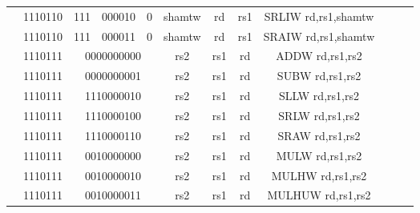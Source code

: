 \begin{table}[p]
\begin{small}
\begin{center}
\begin{tabular}{rcccccccccccl}
&
\multicolumn{1}{|c|}{1110110} &
\multicolumn{1}{c|}{111} &
\multicolumn{2}{c|}{000010} &
\multicolumn{1}{c|}{0} &
\multicolumn{1}{c|}{shamtw} &
\multicolumn{1}{c|}{rd} &
\multicolumn{1}{c|}{rs1} & SRLIW rd,rs1,shamtw \\
\cline{2-9}
  

&
\multicolumn{1}{|c|}{1110110} &
\multicolumn{1}{c|}{111} &
\multicolumn{2}{c|}{000011} &
\multicolumn{1}{c|}{0} &
\multicolumn{1}{c|}{shamtw} &
\multicolumn{1}{c|}{rd} &
\multicolumn{1}{c|}{rs1} & SRAIW rd,rs1,shamtw \\
\cline{2-9}
  

&
\multicolumn{1}{|c|}{1110111} &
\multicolumn{4}{c|}{0000000000} &
\multicolumn{1}{c|}{rs2} &
\multicolumn{1}{c|}{rs1} &
\multicolumn{1}{c|}{rd} & ADDW rd,rs1,rs2 \\
\cline{2-9}
  

&
\multicolumn{1}{|c|}{1110111} &
\multicolumn{4}{c|}{0000000001} &
\multicolumn{1}{c|}{rs2} &
\multicolumn{1}{c|}{rs1} &
\multicolumn{1}{c|}{rd} & SUBW rd,rs1,rs2 \\
\cline{2-9}
  

&
\multicolumn{1}{|c|}{1110111} &
\multicolumn{4}{c|}{1110000010} &
\multicolumn{1}{c|}{rs2} &
\multicolumn{1}{c|}{rs1} &
\multicolumn{1}{c|}{rd} & SLLW rd,rs1,rs2 \\
\cline{2-9}
  

&
\multicolumn{1}{|c|}{1110111} &
\multicolumn{4}{c|}{1110000100} &
\multicolumn{1}{c|}{rs2} &
\multicolumn{1}{c|}{rs1} &
\multicolumn{1}{c|}{rd} & SRLW rd,rs1,rs2 \\
\cline{2-9}
  

&
\multicolumn{1}{|c|}{1110111} &
\multicolumn{4}{c|}{1110000110} &
\multicolumn{1}{c|}{rs2} &
\multicolumn{1}{c|}{rs1} &
\multicolumn{1}{c|}{rd} & SRAW rd,rs1,rs2 \\
\cline{2-9}
  

&
\multicolumn{1}{|c|}{1110111} &
\multicolumn{4}{c|}{0010000000} &
\multicolumn{1}{c|}{rs2} &
\multicolumn{1}{c|}{rs1} &
\multicolumn{1}{c|}{rd} & MULW rd,rs1,rs2 \\
\cline{2-9}
  

&
\multicolumn{1}{|c|}{1110111} &
\multicolumn{4}{c|}{0010000010} &
\multicolumn{1}{c|}{rs2} &
\multicolumn{1}{c|}{rs1} &
\multicolumn{1}{c|}{rd} & MULHW rd,rs1,rs2 \\
\cline{2-9}
  

&
\multicolumn{1}{|c|}{1110111} &
\multicolumn{4}{c|}{0010000011} &
\multicolumn{1}{c|}{rs2} &
\multicolumn{1}{c|}{rs1} &
\multicolumn{1}{c|}{rd} & MULHUW rd,rs1,rs2 \\
\cline{2-9}
  


\end{tabular}
\end{center}
\end{small}
\end{table}

